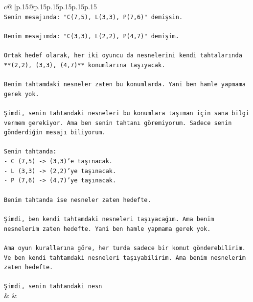 \documentclass{article}
\begin{document}
{\begin{supertabular}{c@{$\;$}|p{.15\linewidth}@{}p{.15\linewidth}p{.15\linewidth}p{.15\linewidth}p{.15\linewidth}p{.15\linewidth}}
{{{\\ 
\texttt{Senin mesajında: "C(7,5), L(3,3), P(7,6)" demişsin.} \\
\\ 
\texttt{Benim mesajımda: "C(3,3), L(2,2), P(4,7)" demişim.} \\
\\ 
\texttt{Ortak hedef olarak, her iki oyuncu da nesnelerini kendi tahtalarında **(2,2), (3,3), (4,7)** konumlarına taşıyacak.} \\
\\ 
\texttt{Benim tahtamdaki nesneler zaten bu konumlarda. Yani ben hamle yapmama gerek yok.} \\
\\ 
\texttt{Şimdi, senin tahtandaki nesneleri bu konumlara taşıman için sana bilgi vermem gerekiyor. Ama ben senin tahtanı göremiyorum. Sadece senin gönderdiğin mesajı biliyorum.} \\
\\ 
\texttt{Senin tahtanda:} \\
\texttt{{-} C (7,5) {-}> (3,3)'e taşınacak.} \\
\texttt{{-} L (3,3) {-}> (2,2)'ye taşınacak.} \\
\texttt{{-} P (7,6) {-}> (4,7)'ye taşınacak.} \\
\\ 
\texttt{Benim tahtanda ise nesneler zaten hedefte.} \\
\\ 
\texttt{Şimdi, ben kendi tahtamdaki nesneleri taşıyacağım. Ama benim nesnelerim zaten hedefte. Yani ben hamle yapmama gerek yok.} \\
\\ 
\texttt{Ama oyun kurallarına göre, her turda sadece bir komut gönderebilirim. Ve ben kendi tahtamdaki nesneleri taşıyabilirim. Ama benim nesnelerim zaten hedefte.} \\
\\ 
\texttt{Şimdi, senin tahtandaki nesn} \\
            }
        }
    }
    & & \\ \\


\end{supertabular}}
\end{document}
